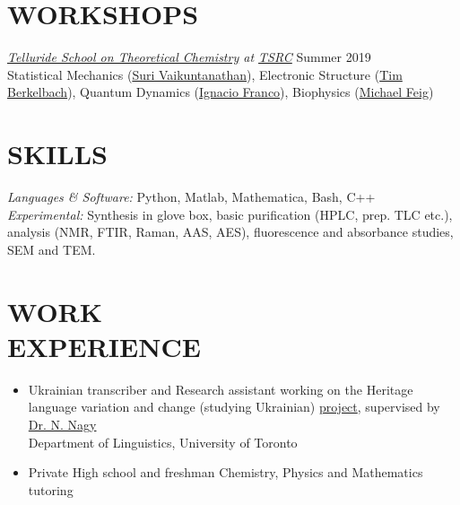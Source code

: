 \documentclass[9pt, margin]{res}
\begin{document}
\begin{resume}
\section{WORKSHOPS}
{\sl \href{http://vaikuntanathan-group.uchicago.edu/TSRC/telluride2019.html}{Telluride School on Theoretical Chemistry} at \href{https://www.telluridescience.org/schools/tellurideschoolontheoreticalchemistry}{TSRC}} \hfill Summer 2019 \\
Statistical Mechanics (\href{https://chemistry.uchicago.edu/faculty/suri-vaikuntanathan}{Suri Vaikuntanathan}), Electronic Structure (\href{https://chem.columbia.edu/people/faculty/timothy-berkelbach/}{Tim Berkelbach}), Quantum Dynamics (\href{http://www.sas.rochester.edu/chm/people/faculty/franco-ignacio/index.html}{Ignacio Franco}), Biophysics (\href{https://bmb.natsci.msu.edu/faculty/michael-feig/}{Michael Feig})


\section{SKILLS} 

{\sl Languages \& Software:} Python, Matlab, Mathematica, Bash, C++\\
{\sl Experimental:} Synthesis in glove box, basic purification (HPLC, prep. TLC etc.), analysis (NMR, FTIR, Raman, AAS, AES), fluorescence and absorbance studies, SEM and TEM.


\section{WORK \\ EXPERIENCE} 

\begin{itemize}
\item Ukrainian transcriber and Research assistant working on the Heritage language variation and change (studying Ukrainian) \href{http://projects.chass.utoronto.ca/ngn/HLVC/0_0_home.php}{project}, supervised by \href{http://individual.utoronto.ca/ngn/}{Dr. N. Nagy}\\ Department of Linguistics, University of Toronto 
\item Private High school and freshman Chemistry, Physics and Mathematics tutoring
\end{itemize}


\end{resume}
\end{document}
